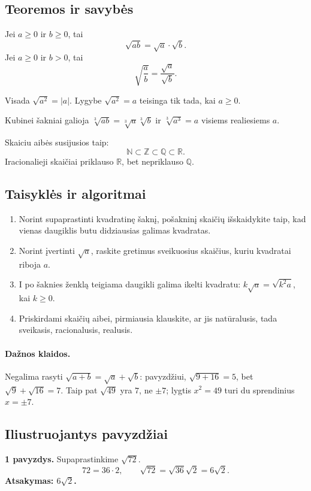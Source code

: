 \subsection{Teoremos ir savybės}
\begin{savybe}
Jei $a\ge0$ ir $b\ge0$, tai
\[
\sqrt{ab}=\sqrt a\cdot\sqrt b.
\]
Jei $a\ge0$ ir $b>0$, tai
\[
\sqrt{\frac{a}{b}}=\frac{\sqrt a}{\sqrt b}.
\]
\end{savybe}
\begin{savybe}
Visada $\sqrt{a^2}=|a|$. Lygybe $\sqrt{a^2}=a$ teisinga tik tada, kai $a\ge0$.
\end{savybe}
\begin{savybe}
Kubinei šakniai galioja $\sqrt[3]{ab}=\sqrt[3]{a}\sqrt[3]{b}$ ir $\sqrt[3]{a^3}=a$ visiems realiesiems $a$.
\end{savybe}
\begin{pastaba}
Skaiciu aibės susijusios taip:
\[
\mathbb{N}\subset\mathbb{Z}\subset\mathbb{Q}\subset\mathbb{R}.
\]
Iracionalieji skaičiai priklauso $\mathbb{R}$, bet nepriklauso $\mathbb{Q}$.
\end{pastaba}

\subsection{Taisyklės ir algoritmai}
\begin{enumerate}[label=\arabic*.]
\item Norint supaprastinti kvadratinę šaknį, pošakninį skaičių išskaidykite taip, kad vienas daugiklis butu didziausias galimas kvadratas.
\item Norint įvertinti $\sqrt a$, raskite gretimus sveikuosius skaičius, kuriu kvadratai riboja $a$.
\item I po šaknies ženklą teigiama daugikli galima ikelti kvadratu: $k\sqrt a=\sqrt{k^2a}$, kai $k\ge0$.
\item Priskirdami skaičių aibei, pirmiausia klauskite, ar jis natūralusis, tada sveikasis, racionalusis, realusis.
\end{enumerate}
\paragraph{Dažnos klaidos.}
Negalima rasyti $\sqrt{a+b}=\sqrt a+\sqrt b$: pavyzdžiui, $\sqrt{9+16}=5$, bet $\sqrt9+\sqrt{16}=7$. Taip pat $\sqrt{49}$ yra $7$, ne $\pm7$; lygtis $x^2=49$ turi du sprendinius $x=\pm7$.

\subsection{Iliustruojantys pavyzdžiai}
\textbf{1 pavyzdys.} Supaprastinkime $\sqrt{72}$.
\[
72=36\cdot2,\qquad \sqrt{72}=\sqrt{36}\sqrt2=6\sqrt2.
\]
\textbf{Atsakymas: $6\sqrt2$.}

